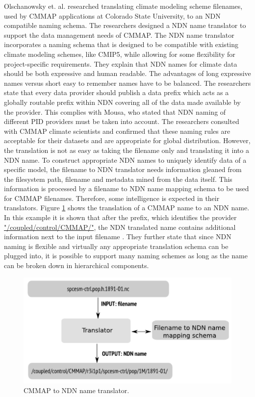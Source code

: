 Olschanowsky et. al. researched translating climate modeling scheme filenames, used by CMMAP applications at Colorado State University, to an NDN compatible 
naming schema. The researchers designed a NDN name translator to support the data management needs of CMMAP. The NDN name translator incorporates a naming schema that is designed to be compatible with existing climate modeling schemes, like CMIP5, while allowing for some flexibility for project-specific requirements. They explain that NDN names for climate data should be both expressive and human readable. The advantages of long expressive names versus short easy to remember names have to be balanced.
The researchers state that every data provider should publish a data prefix which acts as a globally
routable prefix within NDN covering all of the data made available by the provider. This complies with Mousa, who stated that NDN naming of different PID providers must be taken into account. The researchers consulted with CMMAP climate scientists and confirmed that these naming rules are acceptable for their datasets and are appropriate for global distribution. 
However, the translation is not as easy as taking the filename only and translating it into a NDN name. To construct appropriate NDN names to uniquely identify data of a specific model, the filename to NDN translator needs information gleaned from the filesystem path, filename and metadata mined from the data itself. This information is processed by a filename to NDN name mapping schema to be used for CMMAP filenames. Therefore, some intelligence is expected in their translators.
Figure \ref{fig:cmmap_ndnn} shows the translation of a CMMAP name to an NDN name. In this example it is shown that after the prefix, which identifies the provider \url{"/coupled/control/CMMAP/"}, the NDN translated name contains additional information next to the input filename \cite{ndn-clim}.
They further state that since NDN naming is flexible and virtually any appropriate
translation schema can be plugged into, it is possible to support many naming schemes as long as the 
name can be broken down in hierarchical components.

\begin{figure}[H]
\centering
\includegraphics[scale=0.4]{Images/cmip2ndn.png}
\caption{CMMAP to NDN name translator.}
\label{fig:cmmap_ndnn}
\end{figure}

